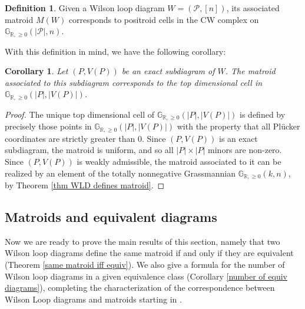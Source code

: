 \documentclass[11pt]{article}
\newcommand{\R}{\mathbb{R}}
\newcommand{\Gr}{\mathbb{G}_{\R, \geq 0}}
\newcommand{\rk}{\textrm{rk} }
\newcommand{\cP}{\mathcal{P}}
\newtheorem{cor}[thm]{Corollary}
\theoremstyle{remark}
\theoremstyle{definition}
\newtheorem{dfn}[thm]{Definition}
\begin{document}
\begin{dfn}
Given a Wilson loop diagram $W = (\cP, [n])$, its associated matroid $M(W)$ corresponds to positroid cells in the CW complex on $\Gr(|\cP|, n)$.
\end{dfn}

With this definition in mind, we have the following corollary:

\begin{cor}
Let $(P, V(P))$ be an exact subdiagram of $W$. The matroid associated to this subdiagram corresponds to the top dimensional cell in $\Gr(|P|, |V(P)|)$.
\end{cor}

\begin{proof}
The unique top dimensional cell of $\Gr(|P|, |V(P)|)$ is defined by precisely those points in $\Gr(|P|, |V(P)|)$ with the property that all Pl\"ucker coordinates are strictly greater than $0$. Since $(P, V(P))$ is an exact subdiagram, the matroid is uniform, and so all $|P| \times |P|$ minors are non-zero. Since $(P, V(P))$ is weakly admissible, the matroid associated to it can be realized by an element of the totally nonnegative Grassmannian $\Gr(k,n)$, by Theorem \ref{thm WLD defines matroid}.
\end{proof}





\subsection{Matroids and equivalent diagrams \label{sec: matroids and equivalence}}

Now we are ready to prove the main results of this section, namely that two Wilson loop diagrams define the same matroid if and only if they are equivalent (Theorem \ref{same matroid iff equiv}).
We also
give a formula for the number of Wilson loop diagrams in a given equivalence class (Corollary \ref{number of equiv diagrams}), completing the characterization of the correspondence between Wilson Loop diagrams and matroids starting in \cite{wilsonloop}.
\end{document}
